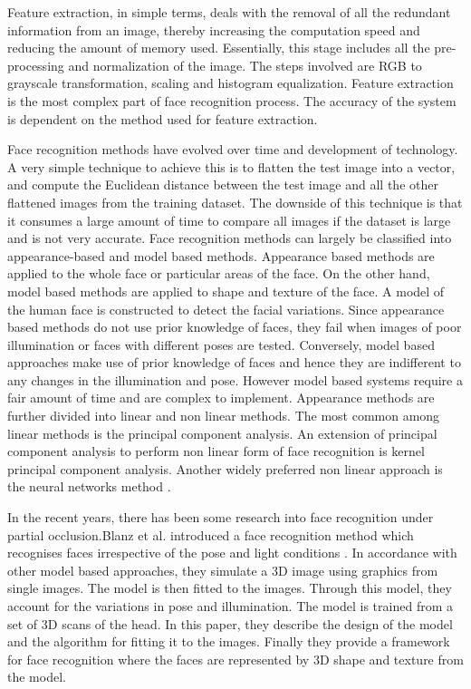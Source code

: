 \documentclass[conference]{IEEEtran}
\begin{document}
Feature extraction, in simple terms, deals with the removal of all the redundant information from an image, thereby increasing the computation speed and reducing the amount of memory used. Essentially, this stage includes all the pre-processing and normalization of the image. The steps involved are RGB to grayscale transformation, scaling and histogram equalization. Feature extraction is the most complex part of face recognition process. The accuracy of the system is dependent on the method used for feature extraction.

Face recognition methods have evolved over time and development of technology. A very simple technique to achieve this is to flatten the test image into a vector, and compute the Euclidean distance between the test image and all the other flattened images from the training dataset. The downside of this technique is that it consumes a large amount of time to compare all images if the dataset is large and is not very accurate. Face recognition methods can largely be classified into appearance-based and model based methods. Appearance based methods are applied to the whole face or particular areas of the face. On the other hand, model based methods are applied to shape and texture of the face. A model of the human face is constructed to detect the facial variations. Since appearance based methods do not use prior knowledge of faces, they fail when images of poor illumination or faces with different poses are tested. Conversely, model based approaches  make use of prior knowledge of faces and hence they are indifferent to any changes in the illumination and pose. However model based systems require a fair amount of time and are complex to implement. Appearance methods are further divided into linear and non linear methods. The most common among linear methods is the principal component analysis. An extension of principal component analysis to perform non linear form of face recognition is kernel principal component analysis. Another widely preferred non linear approach is the neural networks method \cite{agrawal2015evaluation}.

In the recent years, there has been some research into face recognition under partial occlusion.Blanz et al. introduced a face recognition method which recognises faces irrespective of the pose and light conditions \cite{blanz2003face}. In accordance with other model based approaches, they simulate a 3D image using graphics from single images. The model is then fitted to the images. Through this model, they account for the variations in pose and illumination. The model is trained from a set of 3D scans of the head. In this paper, they describe the design of the model and the algorithm for fitting it to the images. Finally they provide a framework for face recognition where the faces are represented by 3D shape and texture from the model. 
\end{document}
